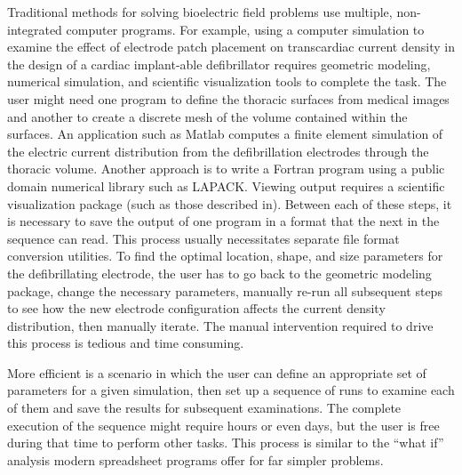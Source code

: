 Traditional methods for solving bioelectric field problems use
multiple, non-integrated computer programs.  For example, using
a computer simulation to examine the effect of electrode patch placement on
transcardiac current density in the design of a cardiac implant-able
defibrillator\cite{CRJ:Sch95b} requires geometric modeling, numerical
simulation, and scientific visualization tools to complete the task.  The
user might need one program to define the thoracic surfaces from medical
images and another to create a discrete mesh of the volume contained within
the surfaces\cite{CRJ:Sch93b}. An application such as Matlab computes a
finite element simulation of the electric current distribution from the
defibrillation electrodes through the thoracic volume\cite{RSM:And93}.
Another approach is to write a Fortran program using a public domain
numerical library such as LAPACK\@ {}.  Viewing output
requires a scientific visualization package (such as those described
in\cite{RSM:All91}).  Between each of these steps, it is necessary to
save the output of one program in a format that the next in the sequence
can read. This process usually necessitates separate file format conversion
utilities.  To find the optimal location, shape, and size parameters for
the defibrillating electrode, the user has to go back to the
geometric modeling package, change the necessary parameters, manually
re-run all subsequent steps to see how the new electrode
configuration affects the current density distribution, then manually
iterate.  The manual intervention required to drive this process is
tedious and time consuming.

More efficient is a scenario in which the user can define an
appropriate set of parameters for a given simulation, then set up
a sequence of runs to examine each of them and save the results for
subsequent examinations.  The complete execution of the sequence might
require hours or even days, but the user is free during that
time to perform other tasks.  This process is similar to the ``what
if'' analysis modern spreadsheet programs offer for far simpler
problems.  

